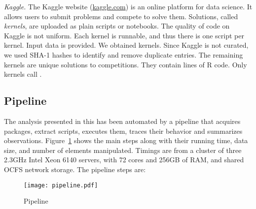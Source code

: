 \documentclass[review,screen,acmsmall,anonymous=true]{acmart}
\newcommand{\mypara}[1]{\medskip\noindent\emph{#1}\xspace}
\begin{document}
\mypara{Kaggle.} The Kaggle website ({\small \url{kaggle.com}}) is an online
platform for data science. It allows users to submit problems and compete to
solve them. Solutions, called \emph{kernels}, are uploaded as plain scripts or
notebooks. The quality of code on Kaggle is not uniform. Each kernel is
runnable, and thus there is one script per kernel. Input data is provided. We
obtained \KaggleKernels kernels. Since Kaggle is not curated, we used SHA-1 hashes
to identify and remove \KaggleDuplicates duplicate entries. The remaining
\KaggleUnique kernels are unique solutions to \KaggleCompetitions competitions.
They contain \KaggleCode lines of R code. Only \KaggleWithEvals kernels call
\eval.

\subsection{Pipeline}

The analysis presented in this has been automated by a pipeline that acquires
packages, extract scripts, executes them, traces their behavior and summarizes
observations. Figure~\ref{fig:pipeline} shows the main steps along with their
running time, data size, and number of elements manipulated. Timings are from a
cluster of three 2.3GHz Intel Xeon 6140 servers, with 72 cores and 256GB of RAM,
and shared OCFS network storage. The pipeline steps are:


\begin{figure}[!h]\hspace{-5mm}
  \texttt{[image: pipeline.pdf]}
  \caption{Pipeline}\label{fig:pipeline}
\end{figure}
\end{document}
